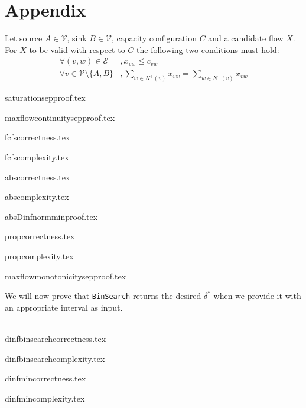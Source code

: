 \section*{Appendix}
  Let source $A \in \mathcal{V}$, sink $B \in \mathcal{V}$, capacity configuration $C$ and a candidate flow $X$. For $X$ to be
  valid with respect to $C$ the following two conditions must hold:
  \begin{align}
  \label{flow1}
    \forall (v, w) \in \mathcal{E}&, x_{vw} \leq c_{vw} \\
  \label{flow2}
    \forall v \in \mathcal{V} \setminus \{A,B\}&, \sum\limits_{w \in N^{+}(v)}x_{wv} = \sum\limits_{w \in N^{-}(v)}x_{vw}
  \end{align}
  
  {saturationsepproof.tex}

  {maxflowcontinuitysepproof.tex}

  {fcfscorrectness.tex}

  {fcfscomplexity.tex}

  {abscorrectness.tex}

  {abscomplexity.tex}

  {absDinfnormminproof.tex}

  {propcorrectness.tex}

  {propcomplexity.tex}

  {maxflowmonotonicitysepproof.tex}

  We will now prove that \texttt{BinSearch} returns the desired $\delta^*$ when we provide it with an appropriate interval as
  input.

  \ \\
  {dinfbinsearchcorrectness.tex}

  {dinfbinsearchcomplexity.tex}

  {dinfmincorrectness.tex}

  {dinfmincomplexity.tex}
